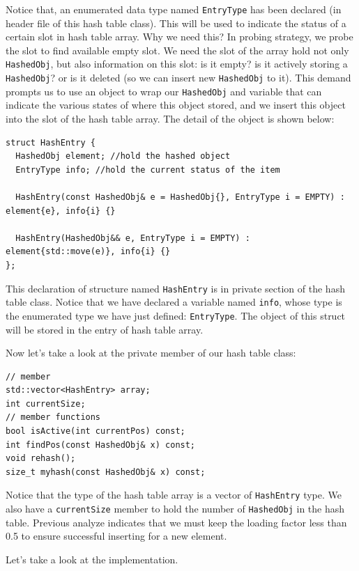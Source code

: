 \documentclass[11pt]{book}
\begin{document}
Notice that, an enumerated data type named \texttt{EntryType} has been declared (in header file of this hash table class). This will be used to indicate the status of a certain slot in hash table array. Why we need this? In probing strategy, we probe the slot to find available empty slot. We need the slot of the array hold not only \texttt{HashedObj}, but also information on this slot: is it empty? is it actively storing a \texttt{HashedObj}? or is it deleted (so we can insert new \texttt{HashedObj} to it). This demand prompts us to use an object to wrap our \texttt{HashedObj} and variable that can indicate the various states of where this object stored, and we insert this object into the slot of the hash table array. The detail of the object is shown below:
\begin{verbatim}
struct HashEntry {
  HashedObj element; //hold the hashed object
  EntryType info; //hold the current status of the item

  HashEntry(const HashedObj& e = HashedObj{}, EntryType i = EMPTY) : element{e}, info{i} {}

  HashEntry(HashedObj&& e, EntryType i = EMPTY) : element{std::move(e)}, info{i} {}
};
\end{verbatim}
This declaration of structure named \texttt{HashEntry} is in private section of the hash table class. Notice that we have declared a variable named \texttt{info}, whose type is the enumerated type we have just defined: \texttt{EntryType}. The object of this struct will be stored in the entry of hash table array.

Now let's take a look at the private member of our hash table class:
\begin{verbatim}
// member 
std::vector<HashEntry> array;
int currentSize;
// member functions
bool isActive(int currentPos) const;
int findPos(const HashedObj& x) const;
void rehash();
size_t myhash(const HashedObj& x) const;
\end{verbatim}

Notice that the type of the hash table array is a vector of \texttt{HashEntry} type. We also have a \texttt{currentSize} member to hold the number of \texttt{HashedObj} in the hash table. Previous analyze indicates that we must keep the loading factor less than 0.5 to ensure successful inserting for a new element.

Let's take a look at the implementation.
\end{document}
